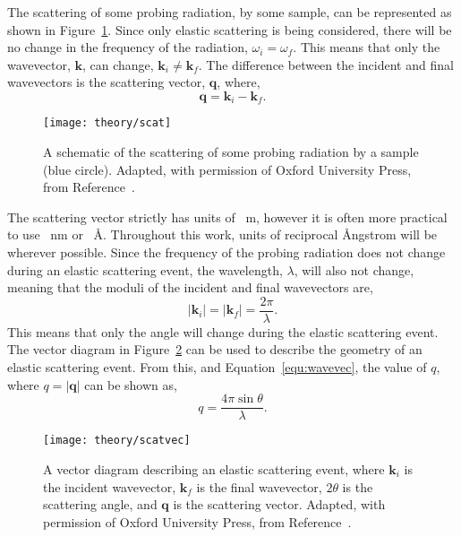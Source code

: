 The scattering of some probing radiation, by some sample, can be represented as shown in Figure~\ref{fig:scat}.
Since only elastic scattering is being considered, there will be no change in the frequency of the radiation, $\omega_i = \omega_f$.
This means that only the wavevector, $\mathbf{k}$, can change, $\mathbf{k}_i\neq \mathbf{k}_f$.
The difference between the incident and final wavevectors is the scattering vector, $\mathbf{q}$, where,
%
\begin{equation}
    \mathbf{q} = \mathbf{k}_i - \mathbf{k}_f.
\end{equation}
%
%
\begin{figure}
    \centering
    \texttt{[image: theory/scat]}
    \caption{A schematic of the scattering of some probing radiation by a sample (blue circle). Adapted, with permission of Oxford University Press\textsuperscript{\textcopyright}, from Reference~\cite{sivia_elementary_2011}.}
    \label{fig:scat}
\end{figure}
%
The scattering vector strictly has units of \si{\per\meter}, however it is often more practical to use \si{\per\nano\meter} or \si{\per\angstrom}.
Throughout this work, units of reciprocal \AA ngstrom will be wherever possible.
Since the frequency of the probing radiation does not change during an elastic scattering event, the wavelength, $\lambda$, will also not change, meaning that the moduli of the incident and final wavevectors are,
%
\begin{equation}
    |\mathbf{k}_i| = |\mathbf{k}_f|=\frac{2\pi}{\lambda}.
    \label{equ:wavevec}
\end{equation}
%
This means that only the angle will change during the elastic scattering event.
The vector diagram in Figure~\ref{fig:scatvec} can be used to describe the geometry of an elastic scattering event.
From this, and Equation~\ref{equ:wavevec}, the value of $q$, where $q = |\mathbf{q}|$ can be shown as,
%
\begin{equation}
    q = \frac{4\pi\sin{\theta}}{\lambda}.
    \label{equ:theq}
\end{equation}
%
%
\begin{figure}
    \centering
    \texttt{[image: theory/scatvec]}
    \caption{A vector diagram describing an elastic scattering event, where $\mathbf{k}_i$ is the incident wavevector, $\mathbf{k}_f$ is the final wavevector, $2\theta$ is the scattering angle, and $\mathbf{q}$ is the scattering vector. Adapted, with permission of Oxford University Press\textsuperscript{\textcopyright}, from Reference~\cite{sivia_elementary_2011}.}
    \label{fig:scatvec}
\end{figure}
